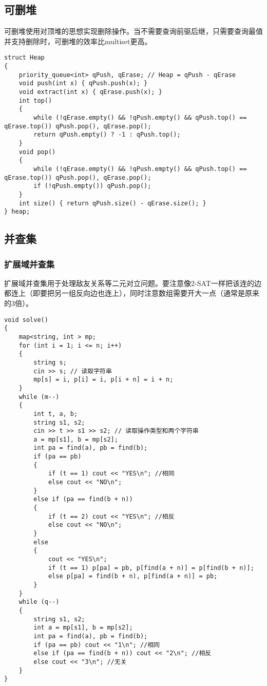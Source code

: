 \documentclass[a4paper, fontset=none]{ctexart}
\begin{document}
\subsection{可删堆}

可删堆使用对顶堆的思想实现删除操作。当不需要查询前驱后继，只需要查询最值并支持删除时，可删堆的效率比multiset更高。
\begin{verbatim}
struct Heap
{
    priority_queue<int> qPush, qErase; // Heap = qPush - qErase
    void push(int x) { qPush.push(x); }
    void extract(int x) { qErase.push(x); }
    int top()
    {
        while (!qErase.empty() && !qPush.empty() && qPush.top() == qErase.top()) qPush.pop(), qErase.pop();
        return qPush.empty() ? -1 : qPush.top();
    }
    void pop()
    {
        while (!qErase.empty() && !qPush.empty() && qPush.top() == qErase.top()) qPush.pop(), qErase.pop();
        if (!qPush.empty()) qPush.pop();
    }
    int size() { return qPush.size() - qErase.size(); }
} heap;
\end{verbatim}
\subsection{并查集}
\subsubsection{扩展域并查集}
扩展域并查集用于处理敌友关系等二元对立问题。要注意像2-SAT一样把该连的边都连上（即要把另一组反向边也连上），同时注意数组需要开大一点（通常是原来的3倍）。
\begin{verbatim}
void solve()
{
    map<string, int > mp;
    for (int i = 1; i <= n; i++)
    {
        string s;
        cin >> s; // 读取字符串
        mp[s] = i, p[i] = i, p[i + n] = i + n;
    }
    while (m--)
    {
        int t, a, b;
        string s1, s2;
        cin >> t >> s1 >> s2; // 读取操作类型和两个字符串
        a = mp[s1], b = mp[s2];
        int pa = find(a), pb = find(b);
        if (pa == pb)
        {
            if (t == 1) cout << "YES\n"; //相同
            else cout << "NO\n";
        }
        else if (pa == find(b + n))
        {
            if (t == 2) cout << "YES\n"; //相反
            else cout << "NO\n";
        }
        else
        {
            cout << "YES\n";
            if (t == 1) p[pa] = pb, p[find(a + n)] = p[find(b + n)];
            else p[pa] = find(b + n), p[find(a + n)] = pb;
        }
    }
    while (q--)
    {
        string s1, s2;
        int a = mp[s1], b = mp[s2];
        int pa = find(a), pb = find(b);
        if (pa == pb) cout << "1\n"; //相同
        else if (pa == find(b + n)) cout << "2\n"; //相反
        else cout << "3\n"; //无关
    }
}
\end{verbatim}
\end{document}
